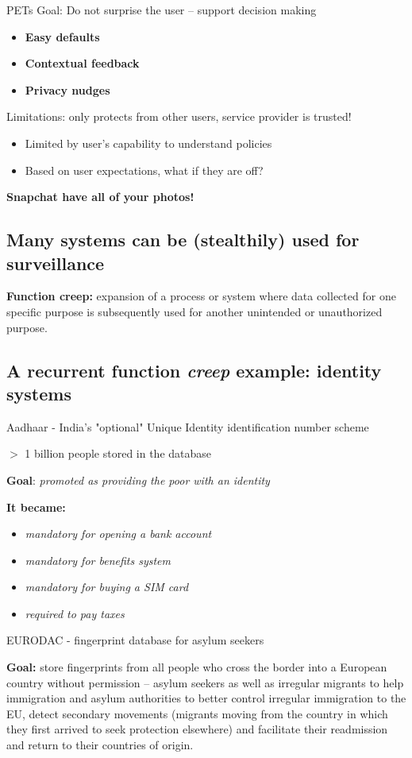 \documentclass[11pt]{article}
\begin{document}
PETs Goal: Do not surprise the user -- support decision making
\begin{itemize}
	\item \textbf{Easy defaults}
	\item \textbf{Contextual feedback}
	\item \textbf{Privacy nudges}
\end{itemize}

Limitations: only protects from other users, service provider is trusted!
\begin{itemize}
	\item Limited by user's capability to understand policies
	\item Based on user expectations, what if they are off?
\end{itemize}

\textbf{Snapchat have all of your photos!}

\subsection*{Many systems can be (stealthily) used for surveillance}

\textbf{Function creep:} expansion of a process or system where data collected for one specific purpose is subsequently used for another unintended or unauthorized purpose. 

\subsection*{A recurrent function \textit{creep} example: identity systems}
Aadhaar - India's "optional" Unique Identity identification number scheme 

$>$ 1 billion people stored in the database

\textbf{Goal}: \textit{promoted as providing the poor with an identity}

\textbf{It became:}
\begin{itemize}
	\item \textit{mandatory for opening a bank account}
	\item \textit{mandatory for benefits system}
	\item \textit{mandatory for buying a SIM card}
	\item \textit{required to pay taxes}
\end{itemize}


EURODAC - fingerprint database for asylum seekers

\textbf{Goal:}  store fingerprints from all people who cross the border into a European country without permission – asylum seekers as well as irregular migrants to help immigration and asylum authorities to better control irregular immigration to the EU, detect secondary movements (migrants moving from the country in which they first arrived to seek protection elsewhere) and facilitate their readmission and return to their countries of origin.
\end{document}
